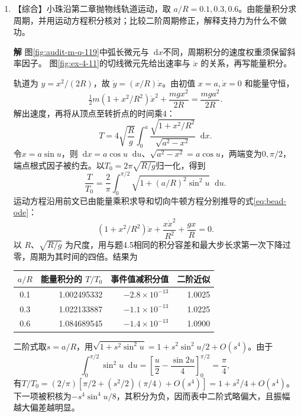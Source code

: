 \documentclass[11pt,openany,fontset=fandol]{ctexbook}
\theoremstyle{plain}\newtheorem{theorem}{定理}[chapter]\newtheorem{proposition}[theorem]{命题}
\theoremstyle{definition}\newtheorem{definition}{定义}[chapter]\newtheorem{example}{例}[chapter]
\theoremstyle{remark}\newtheorem*{remark}{说明}
\newcommand{\SolutionStart}{\par\nobreak\medskip\nobreak\noindent\textbf{解}\quad\ignorespaces}
\newenvironment{solution}{\SolutionStart}{\par\medskip}
\newcommand{\dd}{\mathop{}\!\mathrm d}\newcommand{\ii}{\mathrm i}\newcommand{\ee}{\mathrm e}
\begin{document}
\begin{enumerate}[label=4.\arabic*,itemsep=3pt]
\begin{solution}
该点既是包络边界又可由实轨迹达到，所以判别式重根条件给出的确是最大可达射程。图示特例的最佳角为 $30^\circ$。
\end{solution}

\item \begin{minipage}[t]{\linewidth}
【综合】小珠沿第二章抛物线轨道运动，取 $a/R=0.1,0.3,0.6$。由能量积分求周期，并用运动方程积分核对；比较二阶周期修正，解释支持力为什么不做功。

\end{minipage}

\begin{solution}
图\ref{fig:audit-m-q-119}中弧长微元与$\dd x$不同，周期积分的速度权重须保留斜率因子。
图\ref{fig:ex-4-11}的切线微元先给出速率与 $\dot x$ 的关系，再写能量积分。

轨道为 $y=x^2/(2R)$，故 $\dot y=(x/R)\dot x$。由初值 $x=a,\dot x=0$ 和能量守恒，
\[
\tfrac12m(1+x^2/R^2)\dot x^2+\frac{mgx^2}{2R}
=\frac{mga^2}{2R}.
\]
解出速度，再将从顶点至转折点的时间乘4：
\[
T=4\sqrt{\frac Rg}\int_0^a
\frac{\sqrt{1+x^2/R^2}}{\sqrt{a^2-x^2}}\dd x.
\]
令$x=a\sin u$，则$\dd x=a\cos u\dd u$、$\sqrt{a^2-x^2}=a\cos u$，两端变为$0,\pi/2$，端点根式因子被约去。以$T_0=2\pi\sqrt{R/g}$归一化，得到
\[
\frac T{T_0}=\frac2\pi\int_0^{\pi/2}
\sqrt{1+(a/R)^2\sin^2u}\dd u.
\]
运动方程沿用前文已由能量乘积求导和切向牛顿方程分别推导的式\eqref{eq:bead-ode}：
\[
(1+x^2/R^2)\ddot x+\frac{x\dot x^2}{R^2}+\frac{gx}{R}=0.
\]
以 $R$、$\sqrt{R/g}$ 为尺度，用与题4.5相同的积分容差和最大步长求第一次下降过零，周期为其时间的四倍。结果为
\begin{center}\small
\begin{tabular}{@{}c r r r@{}}\toprule
$a/R$&能量积分的 $T/T_0$&事件值减积分值&二阶近似\\\midrule
0.1&1.002495332&$-2.8\times10^{-13}$&1.0025\\
0.3&1.022133887&$-1.1\times10^{-13}$&1.0225\\
0.6&1.084689545&$-1.4\times10^{-13}$&1.0900\\\bottomrule
\end{tabular}
\end{center}
二阶式取$s=a/R$，用$\sqrt{1+s^2\sin^2u}=1+s^2\sin^2u/2+O(s^4)$。由于
\[\int_0^{\pi/2}\sin^2u\dd u
=\left[\frac u2-\frac{\sin2u}{4}\right]_0^{\pi/2}=\frac\pi4,\]
有$T/T_0=(2/\pi)[\pi/2+(s^2/2)(\pi/4)+O(s^4)]=1+s^2/4+O(s^4)$。下一项被积核为$-s^4\sin^4u/8$，其积分为负，因而表中二阶式略偏大，且振幅越大偏差越明显。


\end{solution}
\end{enumerate}
\end{document}

